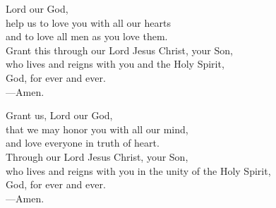 \prayer


\begin{prayerverse}
Lord our God,\\
help us to love you with all our hearts\\
and to love all men as you love them.\\
Grant this through our Lord Jesus Christ, your Son,\\
who lives and reigns with you and the Holy Spirit,\\
God, for ever and ever.\\
{\color{red}---\thinspace}Amen.
\end{prayerverse}


\begin{prayerverse}
Grant us, Lord our God,\\
that we may honor you with all our mind,\\
and love everyone in truth of heart.\\
Through our Lord Jesus Christ, your Son,\\
who lives and reigns with you in the unity of the Holy Spirit,\\
God, for ever and ever.\\
{\color{red}---\thinspace}Amen.
\end{prayerverse}

